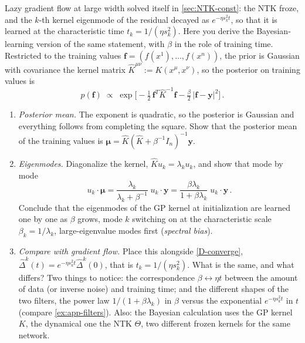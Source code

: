 \documentclass[11pt]{article}
\begin{document}
\begin{exercise}
\label{ex:kernel-ridge}
\important
Lazy gradient flow at large width solved itself in \cref{sec:NTK-const}: the NTK froze, and the $k$-th kernel eigenmode of the residual decayed as $e^{-\eta s_k^2t}$, so that it is learned at the characteristic time $t_k = 1/(\eta s_k^2)$. Here you derive the Bayesian-learning version of the same statement, with $\beta$ in the role of training time. Restricted to the training values $\mathbf f = (f(x^1),\ldots,f(x^n))$, the prior is Gaussian with covariance the kernel matrix $\hat K^{\mu\nu} := K(x^\mu,x^\nu)$, so the posterior on training values is
%
\begin{equation}
    p(\mathbf f)\;\propto\;\exp\Big[-\tfrac{1}{2}\,\mathbf f^T\hat K^{-1}\mathbf f - \tfrac{\beta}{2}\,|\mathbf f-\mathbf y|^2\Big]\,.
\end{equation}
\begin{enumerate}
    \item \emph{Posterior mean.} The exponent is quadratic, so the posterior is Gaussian and everything follows from completing the square. Show that the posterior mean of the training values is $\boldsymbol\mu = \hat K(\hat K+\beta^{-1}I_n)^{-1}\mathbf y$.
    \item\label{ex:kernel-ridge-modes} \emph{Eigenmodes.} Diagonalize the kernel, $\hat Ku_k = \lambda_ku_k$, and show that mode by mode
    \begin{equation} \label{bayes-filter}
        u_k\cdot\boldsymbol\mu = \frac{\lambda_k}{\lambda_k+\beta^{-1}}\;u_k\cdot\mathbf y = \frac{\beta\lambda_k}{1+\beta\lambda_k}\;u_k\cdot\mathbf y\,.
    \end{equation}
    Conclude that the eigenmodes of the GP kernel at initialization are learned one by one as $\beta$ grows, mode $k$ switching on at the characteristic scale $\beta_k = 1/\lambda_k$, large-eigenvalue modes first (\emph{spectral bias}).
    \item \emph{Compare with gradient flow.} Place this alongside \eqref{D-converge}, $\hat\Delta^k(t) = e^{-\eta s_k^2t}\hat\Delta^k(0)$, that is $t_k = 1/(\eta s_k^2)$. What is the same, and what differs? Two things to notice: the correspondence $\beta\leftrightarrow\eta t$ between the amount of data (or inverse noise) and training time; and the different shapes of the two filters, the power law $1/(1+\beta\lambda_k)$ in $\beta$ versus the exponential $e^{-\eta s_k^2t}$ in $t$ (compare \cref{ex:app-filters}). Also: the Bayesian calculation uses the GP kernel $K$, the dynamical one the NTK $\Theta$, two different frozen kernels for the same network.

\end{enumerate}
\end{exercise}
\end{document}
